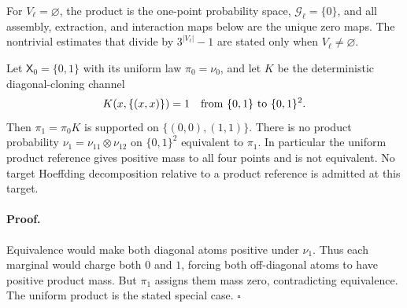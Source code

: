For \(V_\ell=\varnothing\), the product is the one-point probability
space, \(\mathcal G_\ell=\{0\}\), and all assembly, extraction, and
interaction maps below are the unique zero maps.  The nontrivial estimates
that divide by \(3^{|V_\ell|}-1\) are stated only when
\(V_\ell\ne\varnothing\).

Let \(\mathsf X_0=\{0,1\}\) with its uniform law \(\pi_0=\nu_0\), and
let \(K\) be the deterministic diagonal-cloning channel
\begin{equation}
 K(x,\{(x,x)\})=1
 \quad\hbox{from }\{0,1\}\hbox{ to }\{0,1\}^2.
 \label{eq:rg-diagonal-cloning-counterexample}
\end{equation}
Then \(\pi_1=\pi_0K\) is supported on \(\{(0,0),(1,1)\}\).  There is no
product probability \(\nu_1=\nu_{11}\otimes\nu_{12}\) on \(\{0,1\}^2\)
equivalent to \(\pi_1\).  In particular the uniform product reference gives
positive mass to all four points and is not equivalent.  No target Hoeffding
decomposition relative to a product reference is admitted at this target.

\paragraph{Proof.}
Equivalence would make both diagonal atoms positive under \(\nu_1\).  Thus
each marginal would charge both \(0\) and \(1\), forcing both off-diagonal
atoms to have positive product mass.  But \(\pi_1\) assigns them mass zero,
contradicting equivalence.  The uniform product is the stated special case.
\(\square\)

